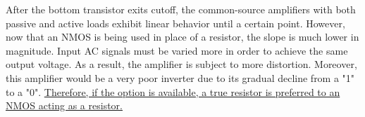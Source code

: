 After the bottom transistor exits cutoff, the common-source amplifiers with both passive and active loads exhibit linear behavior until a certain point. However, now that an NMOS is being used in place of a resistor, the slope is much lower in magnitude. Input AC signals must be varied more in order to achieve the same output voltage. As a result, the amplifier is subject to more distortion. Moreover, this amplifier would be a very poor inverter due to its gradual decline from a "1" to a "0". \uline{Therefore, if the option is available, a true resistor is preferred to an NMOS acting as a resistor.}
